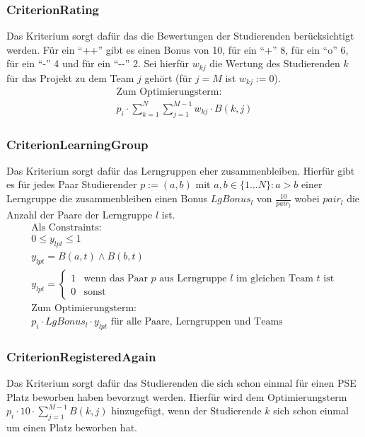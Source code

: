 \documentclass[parskip=full]{scrartcl}
\begin{document}
\subsubsection{CriterionRating}
Das Kriterium sorgt dafür das die Bewertungen der Studierenden berücksichtigt
werden. Für ein \enquote{++} gibt es einen Bonus von 10, für ein \enquote{+} 8,
für ein \enquote{o} 6, für ein \enquote{-} 4 und für ein \enquote{-{}-} 2. Sei
hierfür $w_{kj}$ die Wertung des Studierenden $k$ für das Projekt zu dem Team
$j$ gehört (für $j = M$ ist $w_{kj} := 0$).
\begin{gather*}
\text{Zum Optimierungsterm:}\\
p_i \cdot \sum_{k=1}^{N}\sum_{j=1}^{M-1}w_{kj} \cdot B(k,j) 
\end{gather*}

\subsubsection{CriterionLearningGroup}
Das Kriterium sorgt dafür das Lerngruppen eher zusammenbleiben. Hierfür gibt es
für jedes Paar Studierender $p:= (a,b)$ mit $a,b \in \{ 1\ldots N\}: a > b$
einer Lerngruppe die zusammenbleiben einen Bonus $LgBonus_l$ von $\frac{10}{pair_l}$ wobei $pair_l$ die Anzahl der Paare der
Lerngruppe $l$ ist.
\begin{gather*}
\text{Als Constraints: }\\
0 \le y_{lpt} \le 1  \\
y_{lpt} = B(a,t) \wedge B(b,t)
\\
y_{lpt} =
\begin{cases}
1 & \text{wenn das Paar $p$ aus
Lerngruppe $l$ im gleichen Team $t$ ist} \\
0 &\text{sonst}
\end{cases}
\\
\text{Zum Optimierungsterm: } \\
p_i \cdot LgBonus_l \cdot y_{lpt} \text{ für alle Paare, Lerngruppen und Teams}
\end{gather*} 

\subsubsection{CriterionRegisteredAgain}
Das Kriterium sorgt dafür das Studierenden die sich schon einmal für einen PSE
Platz beworben haben bevorzugt werden. Hierfür wird dem Optimierungsterm
$p_i \cdot 10 \cdot \sum_{j = 1}^{M-1} B(k,j)$ hinzugefügt, wenn der
Studierende $k$ sich schon einmal um einen Platz beworben hat.
\end{document}
